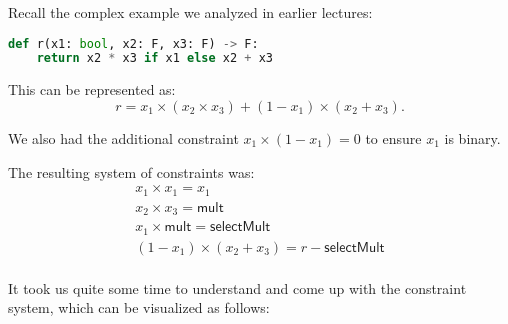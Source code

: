 \documentclass[../lecture-notes-148x210.tex]{subfiles}
\begin{document}
\begin{example}
    Recall the complex example we analyzed in earlier lectures:

    \begin{lstlisting}[language=Python,numbers=none]
def r(x1: bool, x2: F, x3: F) -> F:
    return x2 * x3 if x1 else x2 + x3
    \end{lstlisting}

    This can be represented as:
    \[
        r = x_1 \times (x_2 \times x_3) + (1 - x_1) \times (x_2 + x_3).
    \]

    We also had the additional constraint $x_1 \times (1 - x_1) = 0$ to ensure $x_1$ is binary.

    The resulting system of constraints was:
    \begin{gather*}
        x_1 \times x_1 = x_1 \tag{1}\\
        x_2 \times x_3 = \mathsf{mult} \tag{2}\\
        x_1 \times \mathsf{mult} = \mathsf{selectMult} \tag{3}\\
        (1 - x_1) \times (x_2 + x_3) = r - \mathsf{selectMult} \tag{4}\\
    \end{gather*}
\end{example}

It took us quite some time to understand and come up with the constraint system, which can be visualized as follows:
\end{document}
